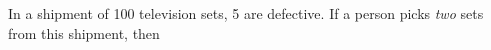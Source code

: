 
%
%
%
%
% 
% 

\question \begin{fullwidth} In a shipment of 100 television sets, 5 are defective. If a person picks 
\textit{two} sets from this shipment, then \end{fullwidth}

\insertQR{}

\ifprintanswers
\fi 

